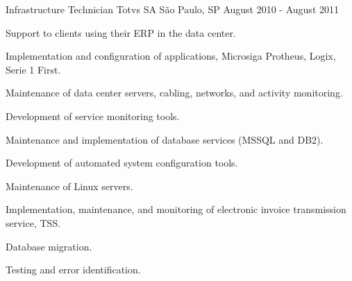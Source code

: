 \begin{cventries}
\cventry
{Infrastructure Technician} %
{Totvs SA} %
{São Paulo, SP} %
{August 2010 - August 2011} %
{
\begin{cvitems} %
  \item {Support to clients using their ERP in the data center.}
  \item {Implementation and configuration of applications, Microsiga Protheus, Logix, Serie 1 First.}
  \item {Maintenance of data center servers, cabling, networks, and activity monitoring.}
  \item {Development of service monitoring tools.}
  \item {Maintenance and implementation of database services (MSSQL and DB2).}
  \item {Development of automated system configuration tools.}
  \item {Maintenance of Linux servers.}
  \item {Implementation, maintenance, and monitoring of electronic invoice transmission service, TSS.}
  \item {Database migration.}
  \item {Testing and error identification.}
\end{cvitems}
}




\end{cventries}
